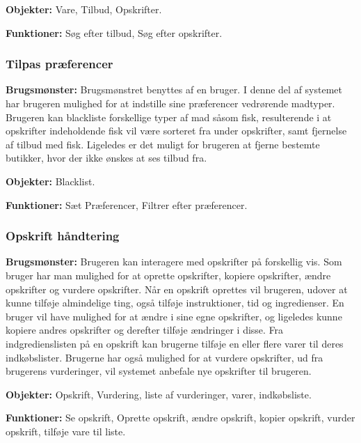 \textbf{Objekter:} Vare, Tilbud, Opskrifter.

\textbf{Funktioner:} Søg efter tilbud, Søg efter opskrifter.

\subsubsection*{Tilpas præferencer}
\textbf{Brugsmønster:} Brugsmønstret benyttes af en bruger.
I denne del af systemet har brugeren mulighed for at indstille sine præferencer vedrørende madtyper.
Brugeren kan blackliste forskellige typer af mad såsom fisk, resulterende i at opskrifter indeholdende fisk vil være sorteret fra under opskrifter, samt fjernelse af tilbud med fisk.
Ligeledes er det muligt for brugeren at fjerne bestemte butikker, hvor der ikke ønskes at ses tilbud fra.

\textbf{Objekter:} Blacklist.

\textbf{Funktioner:} Sæt Præferencer, Filtrer efter præferencer.

\subsubsection*{Opskrift håndtering}
\textbf{Brugsmønster:}
Brugeren kan interagere med opskrifter på forskellig vis. 
Som bruger har man mulighed for at oprette opskrifter, kopiere opskrifter, ændre opskrifter og vurdere opskrifter.
Når en opskrift oprettes vil brugeren, udover at kunne tilføje almindelige ting, også tilføje instruktioner, tid og ingredienser.
En bruger vil have mulighed for at ændre i sine egne opskrifter, og ligeledes kunne kopiere andres opskrifter og derefter tilføje ændringer i disse.
Fra indgredienslisten på en opskrift kan brugerne tilføje en eller flere varer til deres indkøbslister.
Brugerne har også mulighed for at vurdere opskrifter, ud fra brugerens vurderinger, vil systemet anbefale nye opskrifter til brugeren.

\textbf{Objekter:} Opskrift, Vurdering, liste af vurderinger, varer, indkøbsliste.

\textbf{Funktioner:} Se opskrift, Oprette opskrift, ændre opskrift, kopier opskrift, vurder opskrift, tilføje vare til liste.

%
%

